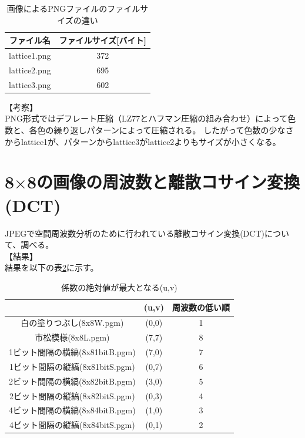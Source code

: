 \documentclass[uplatex, titlepage]{jsarticle}
\begin{document}
\begin{table}[H]
  \centering
  \caption{画像によるPNGファイルのファイルサイズの違い}
  \label{table:png}
  \begin{tabular}{|c|c|} \hline
    ファイル名 & ファイルサイズ[バイト] \\ \hline
    lattice1.png & 372 \\ \hline
    lattice2.png & 695 \\ \hline
    lattice3.png & 602 \\ \hline
  \end{tabular}
\end{table}

【考察】\\
  PNG形式ではデフレート圧縮（LZ77とハフマン圧縮の組み合わせ）によって色数と、各色の繰り返しパターンによって圧縮される。
  したがって色数の少なさからlattice1が、パターンからlattice3がlattice2よりもサイズが小さくなる。\\

\section{8$ \times $8の画像の周波数と離散コサイン変換(DCT)}

  JPEGで空間周波数分析のために行われている離散コサイン変換(DCT)について、調べる。\\
【結果】\\
  結果を以下の表\ref{table:dct}に示す。\\

\begin{table}
  \centering
  \caption{係数の絶対値が最大となる(u,v)}
  \label{table:dct}
  \begin{tabular}{|c|c|c|} \hline
    \ & (u,v) & 周波数の低い順 \\ \hline
    白の塗りつぶし(8x8W.pgm) & (0,0) & 1 \\ \hline
    市松模様(8x8L.pgm) & (7,7) & 8 \\ \hline
    1ビット間隔の横縞(8x81bitB.pgm) & (7,0) & 7 \\ \hline
    1ビット間隔の縦縞(8x81bitS.pgm) & (0,7) & 6 \\ \hline
    2ビット間隔の横縞(8x82bitB.pgm) & (3,0) & 5 \\ \hline
    2ビット間隔の縦縞(8x82bitS.pgm) & (0,3) & 4 \\ \hline
    4ビット間隔の横縞(8x84bitB.pgm) & (1,0) & 3 \\ \hline
    4ビット間隔の縦縞(8x84bitS.pgm) & (0,1) & 2 \\ \hline
  \end{tabular}
\end{table}
\end{document}
